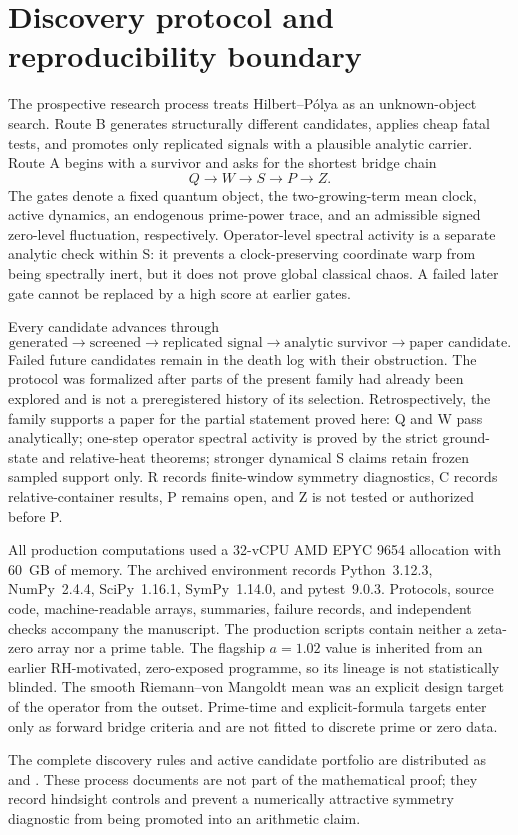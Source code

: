 \section{Discovery protocol and reproducibility boundary}
\label{app:reproducibility}

The prospective research process treats Hilbert--P\'olya as an unknown-object
search.  Route B generates structurally different candidates, applies cheap
fatal tests, and promotes only replicated signals with a plausible analytic
carrier.  Route A begins with a survivor and asks for the shortest bridge
chain
\[
 Q\longrightarrow W\longrightarrow S\longrightarrow P\longrightarrow Z.
\]
The gates denote a fixed quantum object, the two-growing-term mean clock,
active dynamics, an endogenous prime-power trace, and an admissible signed
zero-level fluctuation, respectively.  Operator-level spectral activity is a
separate analytic check within S: it prevents a clock-preserving coordinate
warp from being spectrally inert, but it does not prove global classical
chaos.  A failed later gate cannot be replaced by a high score at earlier
gates.

Every candidate advances through
\[
 \text{generated}\to\text{screened}\to\text{replicated signal}
 \to\text{analytic survivor}\to\text{paper candidate}.
\]
Failed future candidates remain in the death log with their obstruction.  The
protocol was formalized after parts of the present family had already been
explored and is not a preregistered history of its selection.  Retrospectively,
the family supports a paper for the partial statement proved here: Q and W
pass analytically; one-step operator spectral activity is proved by the
strict ground-state and relative-heat theorems; stronger dynamical S claims
retain frozen sampled support only.  R records finite-window symmetry
diagnostics, C records relative-container results, P remains open, and Z is
not tested or authorized before P.

All production computations used a 32-vCPU AMD EPYC 9654 allocation with
60~GB of memory.  The archived environment records Python~3.12.3,
NumPy~2.4.4, SciPy~1.16.1, SymPy~1.14.0, and pytest~9.0.3.  Protocols,
source code, machine-readable arrays, summaries, failure records, and
independent checks accompany the manuscript.  The production scripts contain
neither a zeta-zero array nor a prime table.  The flagship \(a=1.02\) value is
inherited from an earlier RH-motivated, zero-exposed programme, so its lineage
is not statistically blinded.  The smooth Riemann--von Mangoldt mean was an
explicit design target of the operator from the outset.  Prime-time and
explicit-formula targets enter only as forward bridge criteria and are not
fitted to discrete prime or zero data.

The complete discovery rules and active candidate portfolio are distributed
as  and
.  These process documents are not part
of the mathematical proof; they record hindsight controls and prevent a
numerically attractive symmetry diagnostic from being promoted into an
arithmetic claim.
